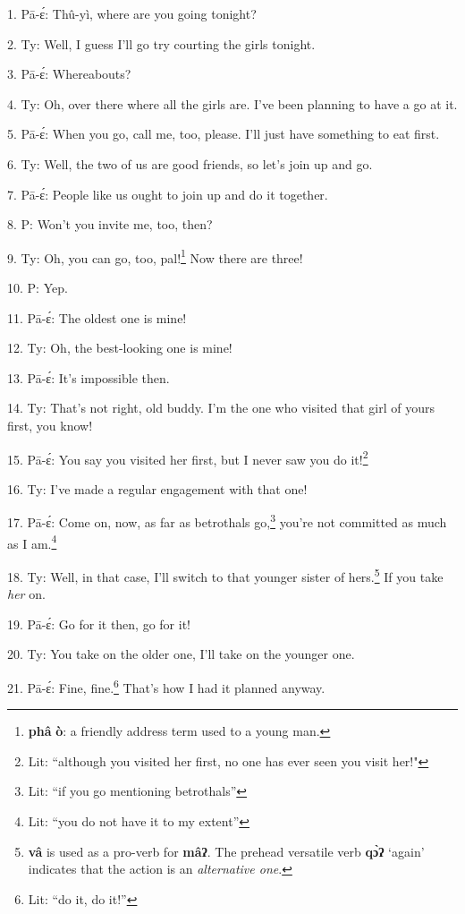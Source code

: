 \setcounter{footnote}{0}

1. Pā-ɛ́: Thû-yì, where are you going tonight?

2. Ty: Well, I guess I'll go try courting the girls tonight.

3. Pā-ɛ́: Whereabouts?

4. Ty: Oh, over there where all the girls are. I've been planning to have
a go at it.

5. Pā-ɛ́: When you go, call me, too, please. I'll just have something to eat
first.

6. Ty: Well, the two of us are good friends, so let's join up and go.

7. Pā-ɛ́: People like us ought to join up and do it together.

8. P: Won't you invite me, too, then?

9. Ty: Oh, you can go, too, pal!\footnote{\textbf{phâ} \textbf{ò}: a friendly address term used to a young man.} Now there are three!

10. P: Yep.

11. Pā-ɛ́: The oldest one is mine!

12. Ty: Oh, the best-looking one is mine!

13. Pā-ɛ́: It's impossible then.

14. Ty: That's not right, old buddy. I'm the one who visited that girl of
yours first, you know!

15. Pā-ɛ́: You say you visited her first, but I never saw you do it!\footnote{Lit: ``although you visited her first, no one has ever seen you visit her!"}

16. Ty: I've made a regular engagement with that one!

17. Pā-ɛ́: Come on, now, as far as betrothals go,\footnote{Lit: ``if you go mentioning betrothals''} you're not committed as
much as I am.\footnote{Lit: ``you do not have it to my extent''}

18. Ty: Well, in that case, I'll switch to that younger sister of hers.\footnote{\textbf{vâ} is used as a pro-verb for \textbf{mâʔ}. The prehead versatile verb \textbf{qɔ̀ʔ} `again' indicates that the action is an \textit{alternative one}.}
If you take \textit{her} on.

19. Pā-ɛ́: Go for it then, go for it!

20. Ty: You take on the older one, I'll take on the younger one.

21. Pā-ɛ́: Fine, fine.\footnote{Lit: ``do it, do it!''} That's how I had it planned anyway.

